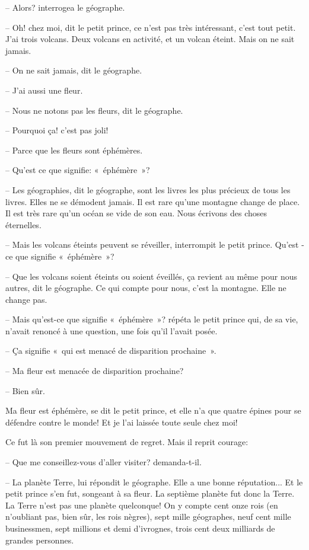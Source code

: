 \documentclass[a4paper]{report}
\begin{document}
-- Alors? interrogea le géographe.

-- Oh! chez moi, dit le petit prince, ce n'est pas très intéressant, c'est tout petit. J'ai trois volcans. Deux volcans en activité, et un volcan éteint. Mais on ne sait jamais.

-- On ne sait jamais, dit le géographe.

-- J'ai aussi une fleur.

-- Nous ne notons pas les fleurs, dit le géographe.

-- Pourquoi ça! c'est pas joli!


-- Parce que les fleurs sont éphémères.

-- Qu'est ce que signifie: «~éphémère~»?

-- Les géographies, dit le géographe, sont les livres les plus précieux de tous les livres. Elles ne se démodent jamais. Il est rare qu'une montagne change de place. Il est très rare qu'un océan se vide de son eau. Nous écrivons des choses éternelles.

-- Mais les volcans éteints peuvent se réveiller, interrompit le petit prince. Qu'est -ce que signifie «~éphémère~»?

-- Que les volcans soient éteints ou soient éveillés, ça revient au même pour nous autres, dit le géographe. Ce qui compte pour nous, c'est la montagne. Elle ne change pas.

-- Mais qu'est-ce que signifie «~éphémère~»? répéta le petit prince qui, de sa vie, n'avait renoncé à une question, une fois qu'il l'avait posée.

-- Ça signifie «~qui est menacé de disparition prochaine~».

-- Ma fleur est menacée de disparition prochaine?

-- Bien sûr.

Ma fleur est éphémère, se dit le petit prince, et elle n'a que quatre épines pour se défendre contre le monde! Et je l'ai laissée toute seule chez moi!

Ce fut là son premier mouvement de regret. Mais il reprit courage:

-- Que me conseillez-vous d'aller visiter? demanda-t-il.

-- La planète Terre, lui répondit le géographe. Elle a une bonne réputation...
Et le petit prince s'en fut, songeant à sa fleur.
\parachapter{} %
La septième planète fut donc la Terre.
La Terre n'est pas une planète quelconque! On y compte cent onze rois (en n'oubliant pas, bien sûr, les rois nègres), sept mille géographes, neuf cent mille businessmen, sept millions et demi d'ivrognes, trois cent deux milliards de grandes personnes.
\end{document}
